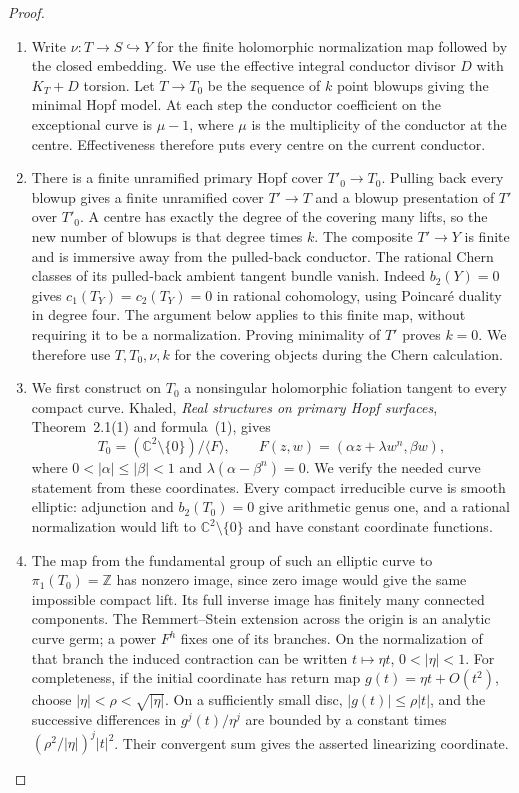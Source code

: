 \begin{proof}

\begin{enumerate}[label={$\langle1\rangle$\arabic*.},leftmargin=*]
\item Write $\nu:T\to S\hookrightarrow Y$ for the finite
holomorphic normalization map followed by the closed
embedding. We use the effective integral conductor
divisor $D$ with $K_T+D$ torsion. Let $T\to T_0$
be the sequence of $k$ point blowups giving the
minimal Hopf model. At each step the conductor
coefficient on the exceptional curve is $\mu-1$,
where $\mu$ is the multiplicity of the conductor
at the centre. Effectiveness therefore puts every
centre on the current conductor.

\item There is a finite unramified primary Hopf cover
$T'_0\to T_0$. Pulling back every blowup gives a
finite unramified cover $T'\to T$ and a blowup
presentation of $T'$ over $T'_0$. A centre has
exactly the degree of the covering many lifts,
so the new number of blowups is that degree times
$k$. The composite $T'\to Y$ is finite and is
immersive away from the pulled-back conductor.
The rational Chern classes of its pulled-back
ambient tangent bundle vanish. Indeed $b_2(Y)=0$
gives $c_1(T_Y)=c_2(T_Y)=0$ in rational cohomology,
using Poincar\'e duality in degree four. The
argument below applies to this finite map, without
requiring it to be a normalization. Proving
minimality of $T'$ proves $k=0$. We therefore use
$T,T_0,\nu,k$ for the covering objects during the
Chern calculation.

\item We first construct on $T_0$ a nonsingular
holomorphic foliation tangent to every compact
curve. Khaled, \emph{Real structures on primary
Hopf surfaces}, Theorem~2.1(1) and formula~(1),
gives
\[
 T_0=(\mathbb C^2\setminus\{0\})/\langle F\rangle,
 \qquad F(z,w)=(\alpha z+\lambda w^n,\beta w),
\]
where $0<|\alpha|\le|\beta|<1$ and
$\lambda(\alpha-\beta^n)=0$. We verify the needed
curve statement from these coordinates. Every
compact irreducible curve is smooth elliptic:
adjunction and $b_2(T_0)=0$ give arithmetic genus
one, and a rational normalization would lift to
$\mathbb C^2\setminus\{0\}$ and have constant
coordinate functions.

\item The map from the fundamental group of such an
elliptic curve to $\pi_1(T_0)=\mathbb Z$ has
nonzero image, since zero image would give the
same impossible compact lift. Its full inverse
image has finitely many connected components.
The Remmert--Stein extension across the origin
is an analytic curve germ; a power $F^h$ fixes
one of its branches. On the normalization of
that branch the induced contraction can be
written $t\mapsto\eta t$, $0<|\eta|<1$.
For completeness, if the initial coordinate
has return map $g(t)=\eta t+O(t^2)$, choose
$|\eta|<\rho<\sqrt{|\eta|}$. On a sufficiently
small disc, $|g(t)|\le\rho|t|$, and the
successive differences in $g^j(t)/\eta^j$
are bounded by a constant times
$(\rho^2/|\eta|)^j|t|^2$. Their convergent sum
gives the asserted linearizing coordinate.


\end{enumerate}
\end{proof}
